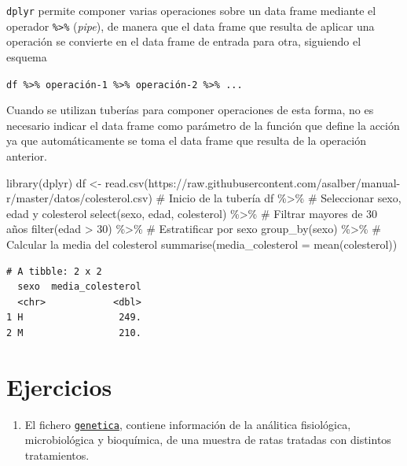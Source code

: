 \documentclass[
  a4paper,
]{scrreport}
\newenvironment{Shaded}{\begin{snugshade}}{\end{snugshade}}
\newcommand{\AttributeTok}[1]{\textcolor[rgb]{0.40,0.45,0.13}{#1}}
\newcommand{\CommentTok}[1]{\textcolor[rgb]{0.37,0.37,0.37}{#1}}
\newcommand{\DecValTok}[1]{\textcolor[rgb]{0.68,0.00,0.00}{#1}}
\newcommand{\FunctionTok}[1]{\textcolor[rgb]{0.28,0.35,0.67}{#1}}
\newcommand{\NormalTok}[1]{\textcolor[rgb]{0.00,0.23,0.31}{#1}}
\newcommand{\OtherTok}[1]{\textcolor[rgb]{0.00,0.23,0.31}{#1}}
\newcommand{\SpecialCharTok}[1]{\textcolor[rgb]{0.37,0.37,0.37}{#1}}
\newcommand{\StringTok}[1]{\textcolor[rgb]{0.13,0.47,0.30}{#1}}
\providecommand{\tightlist}{%
  \setlength{\itemsep}{0pt}\setlength{\parskip}{0pt}}\usepackage{longtable,booktabs,array}
\theoremstyle{definition}
\theoremstyle{definition}
\theoremstyle{remark}
\begin{document}
\texttt{dplyr} permite componer varias operaciones sobre un data frame
mediante el operador \texttt{\%\textgreater{}\%} (\emph{pipe}), de
manera que el data frame que resulta de aplicar una operación se
convierte en el data frame de entrada para otra, siguiendo el esquema

\texttt{df\ \%\textgreater{}\%\ operación-1\ \%\textgreater{}\%\ operación-2\ \%\textgreater{}\%\ ...}

Cuando se utilizan tuberías para componer operaciones de esta forma, no
es necesario indicar el data frame como parámetro de la función que
define la acción ya que automáticamente se toma el data frame que
resulta de la operación anterior.

\begin{Shaded}
\begin{Highlighting}[]
\FunctionTok{library}\NormalTok{(dplyr)}
\NormalTok{df }\OtherTok{\textless{}{-}} \FunctionTok{read.csv}\NormalTok{(}\StringTok{\textquotesingle{}https://raw.githubusercontent.com/asalber/manual{-}r/master/datos/colesterol.csv\textquotesingle{}}\NormalTok{)}
\CommentTok{\# Inicio de la tubería}
\NormalTok{df }\SpecialCharTok{\%\textgreater{}\%} 
    \CommentTok{\# Seleccionar sexo, edad y colesterol}
    \FunctionTok{select}\NormalTok{(sexo, edad, colesterol) }\SpecialCharTok{\%\textgreater{}\%}
    \CommentTok{\# Filtrar mayores de 30 años}
    \FunctionTok{filter}\NormalTok{(edad }\SpecialCharTok{\textgreater{}} \DecValTok{30}\NormalTok{) }\SpecialCharTok{\%\textgreater{}\%}
    \CommentTok{\# Estratificar por sexo}
    \FunctionTok{group\_by}\NormalTok{(sexo) }\SpecialCharTok{\%\textgreater{}\%}
    \CommentTok{\# Calcular la media del colesterol}
    \FunctionTok{summarise}\NormalTok{(}\AttributeTok{media\_colesterol =} \FunctionTok{mean}\NormalTok{(colesterol))}
\end{Highlighting}
\end{Shaded}

\begin{verbatim}
# A tibble: 2 x 2
  sexo  media_colesterol
  <chr>            <dbl>
1 H                 249.
2 M                 210.
\end{verbatim}

\hypertarget{ejercicios-3}{%
\section{Ejercicios}\label{ejercicios-3}}

\begin{enumerate}
\def\labelenumi{\arabic{enumi}.}
\tightlist
\item
  El fichero
  \href{https://raw.githubusercontent.com/asalber/manual-r/master/datos/genetica.csv}{\texttt{genetica}},
  contiene información de la análitica fisiológica, microbiológica y
  bioquímica, de una muestra de ratas tratadas con distintos
  tratamientos.
\end{enumerate}
\end{document}
